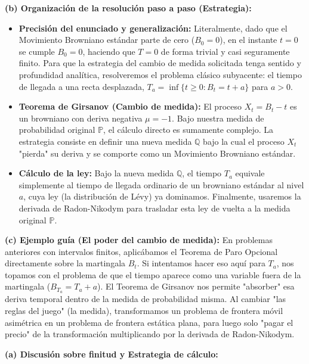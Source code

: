 \documentclass[11pt, letterpaper]{article}
\begin{document}
\begin{solucion}
    \textbf{(b) Organización de la resolución paso a paso (Estrategia):}
    \begin{itemize}
        \item[(i)] \textbf{Precisión del enunciado y generalización:} Literalmente, dado que el Movimiento Browniano estándar parte de cero ($B_0 = 0$), en el instante $t=0$ se cumple $B_0 = 0$, haciendo que $T = 0$ de forma trivial y casi seguramente finito. Para que la estrategia del cambio de medida solicitada tenga sentido y profundidad analítica, resolveremos el problema clásico subyacente: el tiempo de llegada a una recta desplazada, $T_a = \inf\{t \ge 0 : B_t = t + a\}$ para $a > 0$.
        \item[(ii)] \textbf{Teorema de Girsanov (Cambio de medida):} El proceso $X_t = B_t - t$ es un browniano con deriva negativa $\mu = -1$. Bajo nuestra medida de probabilidad original $\mathbb{P}$, el cálculo directo es sumamente complejo. La estrategia consiste en definir una nueva medida $\mathbb{Q}$ bajo la cual el proceso $X_t$ "pierda" su deriva y se comporte como un Movimiento Browniano estándar.
        \item[(iii)] \textbf{Cálculo de la ley:} Bajo la nueva medida $\mathbb{Q}$, el tiempo $T_a$ equivale simplemente al tiempo de llegada ordinario de un browniano estándar al nivel $a$, cuya ley (la distribución de Lévy) ya dominamos. Finalmente, usaremos la derivada de Radon-Nikodym para trasladar esta ley de vuelta a la medida original $\mathbb{P}$.
    \end{itemize}

    \vspace{3mm}
    \textbf{(c) Ejemplo guía (El poder del cambio de medida):}
    En problemas anteriores con intervalos finitos, aplicábamos el Teorema de Paro Opcional directamente sobre la martingala $B_t$. Si intentamos hacer eso aquí para $T_a$, nos topamos con el problema de que el tiempo aparece como una variable fuera de la martingala ($B_{T_a} = T_a + a$). 
    El Teorema de Girsanov nos permite "absorber" esa deriva temporal dentro de la medida de probabilidad misma. Al cambiar "las reglas del juego" (la medida), transformamos un problema de frontera móvil asimétrica en un problema de frontera estática plana, para luego solo "pagar el precio" de la transformación multiplicando por la derivada de Radon-Nikodym.

    \vspace{3mm}
    \textbf{(a) Discusión sobre finitud y Estrategia de cálculo:}


\end{solucion}
\end{document}

